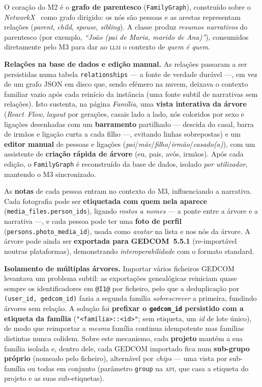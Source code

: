 O coração do M2 é o \textbf{grafo de parentesco} (\texttt{FamilyGraph}),
construído sobre o \emph{NetworkX}~\cite{networkx} como grafo dirigido: os
nós são pessoas e as arestas representam relações (\emph{parent},
\emph{child}, \emph{spouse}, \emph{sibling}). A classe produz
\emph{resumos narrativos} do parentesco (por exemplo, \emph{``João (pai de
Maria, marido de Ana)''}), consumidos diretamente pelo M3 para dar ao
\textsc{llm} o contexto de \emph{quem é quem}.

\textbf{Relações na base de dados e edição manual.} As relações passaram a
ser persistidas numa tabela \texttt{relationships} --- a fonte de verdade
durável ---, em vez de um grafo JSON em disco que, sendo efémero na nuvem,
deixava o contexto familiar vazio após cada reinício da instância (uma
fonte subtil de narrativas sem relações). Isto sustenta, na página
\emph{Família}, uma \textbf{vista interativa da árvore} (\emph{React~Flow},
\emph{layout} por gerações, casais lado a lado, nós coloridos por sexo e
ligações desenhadas com um \textbf{barramento} partilhado --- descida do
casal, barra de irmãos e ligação curta a cada filho ---, evitando linhas
sobrepostas) e um \textbf{editor manual} de pessoas e ligações
(\emph{pai}/\emph{mãe}/\emph{filho}/\emph{irmão}/\emph{casado(a)}), com um
assistente de \textbf{criação rápida de árvore} (eu, pais, avós, irmãos).
Após cada edição, o \texttt{FamilyGraph} é reconstruído da base de dados,
isolado \emph{por utilizador}, mantendo o M3 sincronizado.

As \textbf{notas} de cada pessoa entram no contexto do M3, influenciando a
narrativa. Cada fotografia pode ser \textbf{etiquetada com quem nela
aparece} (\texttt{media\_files.person\_ids}), ligando \emph{rostos a nomes}
--- a ponte entre a árvore e a narrativa ---, e cada pessoa pode ter uma
\textbf{foto de perfil} (\texttt{persons.photo\_media\_id}), usada como
\emph{avatar} na lista e nos nós da árvore. A árvore pode ainda ser
\textbf{exportada para GEDCOM~5.5.1} (re-importável noutras plataformas),
demonstrando \emph{interoperabilidade} com o formato standard.

\textbf{Isolamento de múltiplas árvores.} Importar vários ficheiros GEDCOM
levantava um problema subtil: as exportações genealógicas reiniciam quase
sempre os identificadores em \texttt{@I1@} por ficheiro, pelo que a
deduplicação por \texttt{(user\_id, gedcom\_id)} fazia a segunda família
\emph{sobrescrever} a primeira, fundindo árvores sem relação. A solução foi
\textbf{prefixar o \texttt{gedcom\_id} persistido com a etiqueta da família}
(\texttt{"<família>::<id>"}; sem etiqueta, um \emph{id} de lote único), de
modo que reimportar a \emph{mesma} família continua idempotente mas famílias
distintas nunca colidem. Sobre este mecanismo, cada \textbf{projeto} mantém
a sua família isolada e, dentro dele, cada GEDCOM importado fica num
\textbf{sub-grupo próprio} (nomeado pelo ficheiro), alternável por
\emph{chips} — uma vista por sub-família ou todas em conjunto (parâmetro
\texttt{group} na \textsc{api}, que casa a etiqueta do projeto e as suas
sub-etiquetas).

